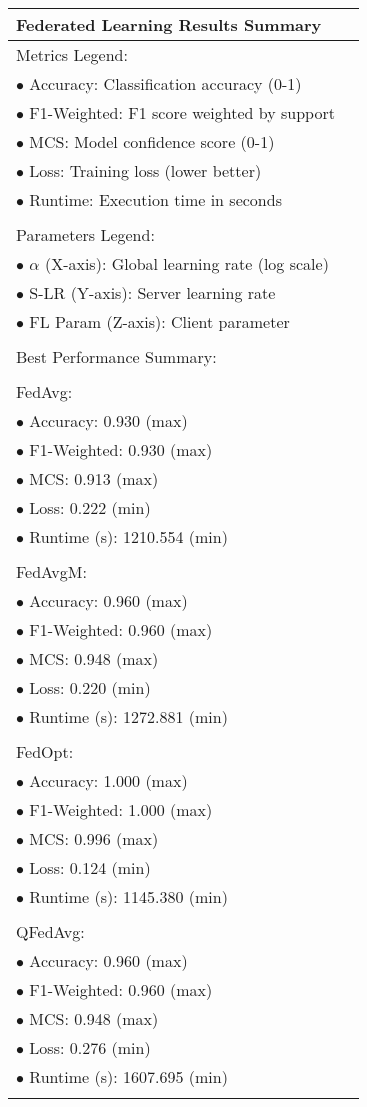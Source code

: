 \documentclass[border=5pt]{standalone}
\begin{document}
    \begin{tabular}{>{\raggedright\arraybackslash}p{5cm}l}
    \toprule
    \textbf{Federated Learning Results Summary} & \\
    \midrule
    Metrics Legend:\\
$\bullet$ Accuracy: Classification accuracy (0-1)\\
$\bullet$ F1-Weighted: F1 score weighted by support\\
$\bullet$ MCS: Model confidence score (0-1)\\
$\bullet$ Loss: Training loss (lower better)\\
$\bullet$ Runtime: Execution time in seconds\\
\\
Parameters Legend:\\
$\bullet$ $\alpha$ (X-axis): Global learning rate (log scale)\\
$\bullet$ S-LR (Y-axis): Server learning rate\\
$\bullet$ FL Param (Z-axis): Client parameter\\
\\
Best Performance Summary:\\
\\
FedAvg:\\
$\bullet$ Accuracy: 0.930 (max)\\
$\bullet$ F1-Weighted: 0.930 (max)\\
$\bullet$ MCS: 0.913 (max)\\
$\bullet$ Loss: 0.222 (min)\\
$\bullet$ Runtime (s): 1210.554 (min)\\
\\
FedAvgM:\\
$\bullet$ Accuracy: 0.960 (max)\\
$\bullet$ F1-Weighted: 0.960 (max)\\
$\bullet$ MCS: 0.948 (max)\\
$\bullet$ Loss: 0.220 (min)\\
$\bullet$ Runtime (s): 1272.881 (min)\\
\\
FedOpt:\\
$\bullet$ Accuracy: 1.000 (max)\\
$\bullet$ F1-Weighted: 1.000 (max)\\
$\bullet$ MCS: 0.996 (max)\\
$\bullet$ Loss: 0.124 (min)\\
$\bullet$ Runtime (s): 1145.380 (min)\\
\\
QFedAvg:\\
$\bullet$ Accuracy: 0.960 (max)\\
$\bullet$ F1-Weighted: 0.960 (max)\\
$\bullet$ MCS: 0.948 (max)\\
$\bullet$ Loss: 0.276 (min)\\
$\bullet$ Runtime (s): 1607.695 (min)\\
\\

    \bottomrule
    \end{tabular}
    
\end{document}
